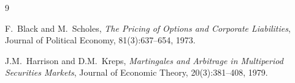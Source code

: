 \documentclass[twocolumn,10pt]{article}
\begin{document}
\begin{thebibliography}{9}

F.~Black and M.~Scholes, \emph{The Pricing of Options and Corporate Liabilities}, Journal of Political Economy, 81(3):637--654, 1973.

J.M.~Harrison and D.M.~Kreps, \emph{Martingales and Arbitrage in Multiperiod Securities Markets}, Journal of Economic Theory, 20(3):381--408, 1979.



\end{thebibliography}
\end{document}
